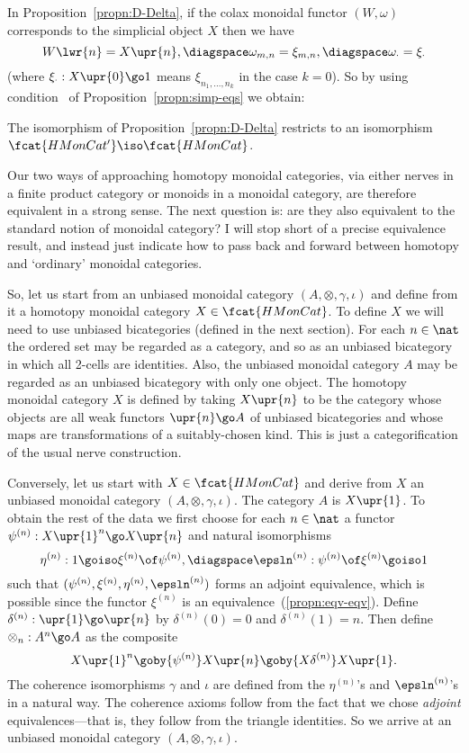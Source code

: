 In Proposition~\ref{propn:D-Delta}, if the colax monoidal functor $(W,
\omega)$ corresponds to the simplicial object $X$ then we have
\[
W\lwr{n} = X\upr{n},
\diagspace
\omega_{m,n} = \xi_{m,n}, 
\diagspace
\omega_\cdot = \xi_\cdot
\]
(where $\xi_\cdot: X\upr{0} \go 1$ means $\xi_{n_1, \ldots, n_k}$ in the case
$k=0$).  So by using condition~ of
Proposition~\ref{propn:simp-eqs} we obtain:
%
\begin{cor}
The isomorphism of Proposition~\ref{propn:D-Delta} restricts to an
isomorphism $\fcat{HMonCat'} \iso \fcat{HMonCat}$.
\done
\end{cor}


Our two ways of approaching homotopy monoidal categories, via either nerves
in a finite product category or monoids in a monoidal category, are
therefore equivalent in a strong sense.  The next question is: are they
also equivalent to the standard notion of monoidal category?  I will stop
short of a precise equivalence result, and instead just indicate how to
pass back and forward between homotopy and `ordinary' monoidal categories.

So, let us start from an unbiased%
%
%
monoidal category $(A, \otimes, \gamma,
\iota)$ and define from it a homotopy monoidal category $X \in
\fcat{HMonCat}$.  To define $X$ we will need to use unbiased bicategories
(defined in the next section).  For each $n\in\nat$ the ordered set 
may be regarded as a category, and so as an unbiased bicategory in which
all 2-cells are identities.  Also, the unbiased monoidal category $A$ may
be regarded as an unbiased bicategory with only one object.  The homotopy
monoidal category $X$ is defined by taking $X\upr{n}$ to be the category
whose objects are all weak functors $\upr{n} \go A$ of unbiased
bicategories and whose maps are transformations of a suitably-chosen kind.
This is just a categorification%
%
%
of the usual nerve%
%
%
construction.

Conversely, let us start with $X \in \fcat{HMonCat}$ and derive from $X$ an
unbiased monoidal category $(A, \otimes, \gamma, \iota)$.  The category $A$
is $X\upr{1}$.  To obtain the rest of the data we first choose for each
$n\in\nat$ a functor $\psi^{(n)}: X\upr{1}^n \go X\upr{n}$ and natural
isomorphisms
\[
\eta^{(n)}: 1 \goiso \xi^{(n)} \of \psi^{(n)},
\diagspace
\epsln^{(n)}: \psi^{(n)} \of \xi^{(n)} \goiso 1
\]
such that $(\psi^{(n)},\xi^{(n)},\eta^{(n)},\epsln^{(n)})$ forms an adjoint
equivalence, which is possible since the functor $\xi^{(n)}$ is an
equivalence~(\ref{propn:eqv-eqv}).  Define $\delta^{(n)}: \upr{1} \go
\upr{n}$ by $\delta^{(n)}(0) = 0$ and $\delta^{(n)}(1) = n$.  Then define
$\otimes_n: A^n \go A$ as the composite
\[
X\upr{1}^n \goby{\psi^{(n)}} X\upr{n} \goby{X\delta^{(n)}} X\upr{1}.
\]
The coherence isomorphisms $\gamma$ and $\iota$ are defined from the
$\eta^{(n)}$'s and $\epsln^{(n)}$'s in a natural way.  The coherence axioms
follow from the fact that we chose \emph{adjoint} equivalences---that is,
they follow from the triangle identities.  So we arrive at an unbiased
monoidal category $(A, \otimes, \gamma, \iota)$.


